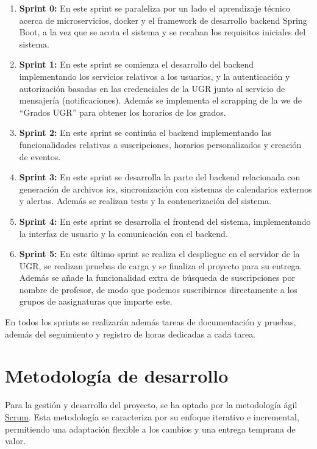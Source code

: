 \begin{enumerate}
    \item \textbf{Sprint 0:} En este sprint se paraleliza por un lado el aprendizaje técnico acerca de microservicios, docker y el framework de desarrollo backend Spring Boot, a la vez que se acota el sistema y se recaban los requisitos iniciales del sistema.
    \item \textbf{Sprint 1:} En este sprint se comienza el desarrollo del backend implementando los servicios relativos a los usuarios, y la autenticación y autorización basadas en las credenciales de la UGR junto al servicio de mensajería (notificaciones). Además se implementa el scrapping de la we de ``Grados UGR'' para obtener los horarios de los grados.
    \item \textbf{Sprint 2:} En este sprint se continúa el backend implementando las funcionalidades relativas a suscripciones, horarios personalizados y creación de eventos.
    \item \textbf{Sprint 3:} En este sprint se desarrolla la parte del backend relacionada con generación de archivos ics, sincronización con sistemas de calendarios externos y alertas. Además se realizan tests y la contenerización del sistema.
    \item \textbf{Sprint 4:} En este sprint se desarrolla el frontend del sistema, implementando la interfaz de usuario y la comunicación con el backend.
    \item \textbf{Sprint 5:} En este último sprint se realiza el despliegue en el servidor de la UGR, se realizan pruebas de carga y se finaliza el proyecto para su entrega. Además se añade la funcionalidad extra de búsqueda de suscripciones por nombre de profesor, de modo que podemos suscribirnos directamente a los grupos de aasignaturas que imparte este.
\end{enumerate}

En todos los sprints se realizarán además tareas de documentación y pruebas, además del seguimiento y registro de horas dedicadas a cada tarea.

\section{Metodología de desarrollo}
Para la gestión y desarrollo del proyecto, se ha optado por la metodología ágil \hyperlink{scrum}{Scrum}. Esta metodología se caracteriza por su enfoque iterativo e incremental, permitiendo una adaptación flexible a los cambios y una entrega temprana de valor.

